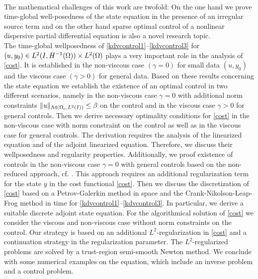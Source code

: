 \\
The mathematical challenges of this work are twofold: On the one hand we prove time-global well-posedness of the state equation in the presence of an irregular source term and on the other hand sparse optimal control of a nonlinear dispersive partial differential equation is also a novel research topic.\\
{\color{red} The time-global wellposedness of \eqref{kdvcontrol1}--\eqref{kdvcontrol3} for $(u,y_0)\in \Hm1\times L^2(\Omega)$ plays a very important role in the analysis of \eqref{cost}. It is established in the non-viscous case $(\gamma=0)$ for small data $(u,y_0)$ and the viscous case $(\gamma>0)$ for general data. Based on these results concerning the state equation we establish the existence of an optimal control in two different scenarios, namely in the non-viscous case $\gamma=0$ with additional norm constraints $\|u\|_{\mathcal{M}(\Omega_c, L^{2}(I))}\leq \beta$ on the control and in the viscous case $\gamma>0$ for general controls. Then we derive necessary optimality conditions for \eqref{cost} in the non-viscous case with norm constraint on the control as well as in the viscous case for general controls. The derivation requires the analysis of the linearized \KdVB equation and of the adjoint linearized \KdVB equation. Therefore, we discuss their wellposedness and regularity properties. Additionally, we proof existence of controls in the non-viscous case $\gamma=0$ with general controls based on the non-reduced approach, cf. \cite{lions1985control}. This approach requires an additional regularization term for the state $y$ in the cost functional \eqref{cost}. Then we discuss the discretization of \eqref{cost} based on a Petrov-Galerkin method in space and the Crank-Nikolson-Leap-Frog method in time for \eqref{kdvcontrol1}--\eqref{kdvcontrol3}. In particular, we derive a suitable discrete adjoint state equation. For the algorithmical solution of \eqref{cost} we consider the viscous and non-viscous case without norm constraints on the control. Our strategy is based on an additional $L^2$-regularization in \eqref{cost} and a continuation strategy in the regularization parameter. The $L^2$-regularized problems are solved by a trust-region semi-smooth Newton method. We conclude with some numerical examples on the \KdVB equation, which include an inverse problem and a control problem.}

